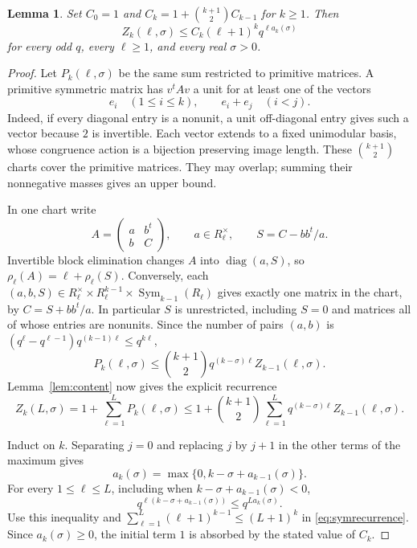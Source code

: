 \documentclass[11pt]{article}
\numberwithin{equation}{section}
\newtheorem{lemma}[theorem]{Lemma}
\theoremstyle{remark}
\newcommand{\Sym}{\operatorname{Sym}}
\begin{document}
\begin{lemma}\label{lem:symmetric}
Set $C_0=1$ and $C_k=1+\binom{k+1}{2}C_{k-1}$ for $k\ge1$.
Then
\begin{equation}\label{eq:symmetricbound}
 Z_k(\ell,\sigma )\le C_k(\ell+1)^k q^{\ell a_k(\sigma )}
\end{equation}
for every odd $q$, every $\ell\ge1$, and every real $\sigma >0$.
\end{lemma}
\begin{proof}
Let $P_k(\ell,\sigma )$ be the same sum restricted to primitive matrices.
A primitive symmetric matrix has $v^tAv$ a unit for at least one of
the vectors
\[
 e_i\quad(1\le i\le k),\qquad e_i+e_j\quad(i<j).
\]
Indeed, if every diagonal entry is a nonunit, a unit off-diagonal
entry gives such a vector because $2$ is invertible. Each vector
extends to a fixed unimodular basis, whose congruence action is a
bijection preserving image length. These $\binom{k+1}{2}$ charts
cover the primitive matrices. They may overlap; summing their
nonnegative masses gives an upper bound.

In one chart write
\[
 A=\begin{pmatrix}a&b^t\\ b&C\end{pmatrix},\qquad a\in R_\ell^\times,
 \qquad S=C-bb^t/a.
\]
Invertible block elimination changes $A$ into $\operatorname{diag}(a,S)$,
so $\rho_\ell(A)=\ell+\rho_\ell(S)$. Conversely, each
$(a,b,S)\in R_\ell^\times\times R_\ell^{k-1}\times\Sym_{k-1}(R_\ell)$
gives exactly one matrix in the chart, by $C=S+bb^t/a$.
In particular $S$ is unrestricted, including $S=0$ and matrices
all of whose entries are nonunits. Since the number of pairs $(a,b)$
is $(q^\ell-q^{\ell-1})q^{(k-1)\ell}\le q^{k\ell}$,
\begin{equation}\label{eq:symunit}
 P_k(\ell,\sigma )\le\binom{k+1}{2}q^{(k-\sigma )\ell}Z_{k-1}(\ell,\sigma ).
\end{equation}
Lemma~\ref{lem:content} now gives the explicit recurrence
\begin{equation}\label{eq:symrecurrence}
 Z_k(L,\sigma )=1+\sum_{\ell=1}^{L}P_k(\ell,\sigma )
 \le1+\binom{k+1}{2}\sum_{\ell=1}^{L}
                       q^{(k-\sigma )\ell}Z_{k-1}(\ell,\sigma ).
\end{equation}

Induct on $k$. Separating $j=0$ and replacing $j$ by $j+1$ in
the other terms of the maximum gives
\[
 a_k(\sigma )=\max\{0,k-\sigma +a_{k-1}(\sigma )\}.
\]
For every $1\le\ell\le L$, including when
$k-\sigma +a_{k-1}(\sigma )<0$,
\[
 q^{\ell(k-\sigma +a_{k-1}(\sigma ))}\le q^{La_k(\sigma )}.
\]
Use this inequality and
$\sum_{\ell=1}^{L}(\ell+1)^{k-1}\le(L+1)^k$
in \eqref{eq:symrecurrence}. Since $a_k(\sigma )\ge0$, the initial
term $1$ is absorbed by the stated value of $C_k$.
\end{proof}
\end{document}
